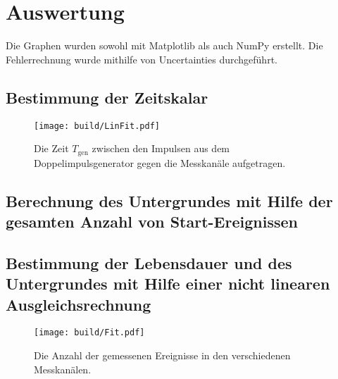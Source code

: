 \section{Auswertung}
\label{sec:Auswertung}


Die Graphen wurden sowohl mit Matplotlib \cite{matplotlib} als auch NumPy \cite{numpy} erstellt. Die
Fehlerrechnung wurde mithilfe von Uncertainties \cite{uncertainties} durchgeführt.


\subsection{Bestimmung der Zeitskalar}
\begin{figure}
	\centering
	\texttt{[image: build/LinFit.pdf]}
	\caption{Die Zeit $T_\text{gen}$ zwischen den Impulsen aus dem Doppelimpulsgenerator gegen die Messkanäle aufgetragen.}
	\label{fig:erste}
\end{figure}
\subsection{Berechnung des Untergrundes mit Hilfe der gesamten Anzahl von Start-Ereignissen}

\subsection{Bestimmung der Lebensdauer und des Untergrundes mit Hilfe einer nicht linearen Ausgleichsrechnung}
\begin{figure}
	\centering
	\texttt{[image: build/Fit.pdf]}
	\caption{Die Anzahl der gemessenen Ereignisse in den verschiedenen Messkanälen.}
	\label{fig:erste}
\end{figure}

